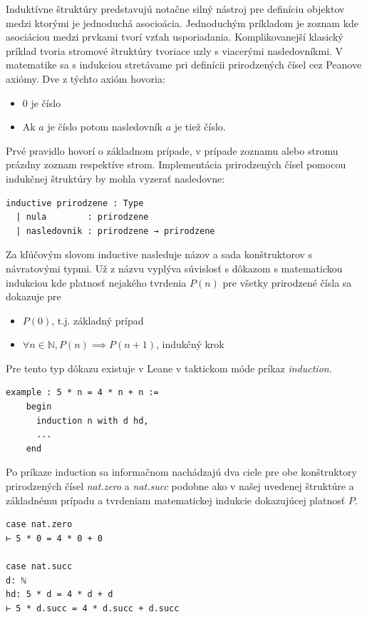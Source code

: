 \documentclass[a4paper,10pt,oneside]{report}%
\begin{document}
    Induktívne štruktúry predstavujú notačne silný nástroj pre definíciu objektov
medzi ktorými je jednoduchá asocioácia.
    Jednoduchým príkladom je zoznam kde asociáciou medzi prvkami tvorí vzťah
usporiadania.
    Komplikovanejší klasický príklad tvoria stromové štruktúry tvoriace uzly
s viacerými nasledovníkmi.
    V matematike sa s indukciou stretávame pri definícii prirodzených čísel
cez Peanove axiómy.
    Dve z týchto axióm hovoria:
\begin{itemize}
    \item 0 je číslo
    \item Ak $a$ je číslo potom nasledovník $a$ je tiež číslo.
\end{itemize}
    Prvé pravidlo hovorí o základnom prípade, v prípade zoznamu alebo stromu prázdny
zoznam respektíve strom.
    Implementácia prirodzených čísel pomocou indukčnej štruktúry by mohla vyzerať
nasledovne:
\begin{lstlisting}
inductive prirodzene : Type
  | nula        : prirodzene
  | nasledovnik : prirodzene → prirodzene
\end{lstlisting}
    Za kľúčovým slovom inductive nasleduje názov a sada konštruktorov s návratovými
typmi.
    Už z názvu vyplýva súvislosť s dôkazom s matematickou indukciou kde platnosť
nejakého tvrdenia $P(n)$ pre všetky prirodzené čísla sa dokazuje pre
\begin{itemize}
    \item $P(0)$, t.j. základný prípad
    \item $\forall n \in \mathbb{N}, P(n) \implies P(n+1)$, indukčný krok
\end{itemize}
    Pre tento typ dôkazu existuje v Leane v taktickom móde príkaz \emph{induction}.
\begin{lstlisting}
example : 5 * n = 4 * n + n :=
    begin
      induction n with d hd,
      ...
    end
\end{lstlisting}
    Po príkaze induction sa informačnom nachádzajú dva ciele pre obe konštruktory
prirodzených čísel \emph{nat.zero} a \emph{nat.succ} podobne ako v našej uvedenej
štruktúre a základnému prípadu a tvrdeniam matematickej indukcie dokazujúcej platnosť
$P$.
\begin{lstlisting}
case nat.zero
⊢ 5 * 0 = 4 * 0 + 0

case nat.succ
d: ℕ
hd: 5 * d = 4 * d + d
⊢ 5 * d.succ = 4 * d.succ + d.succ
\end{lstlisting}
\end{document}
